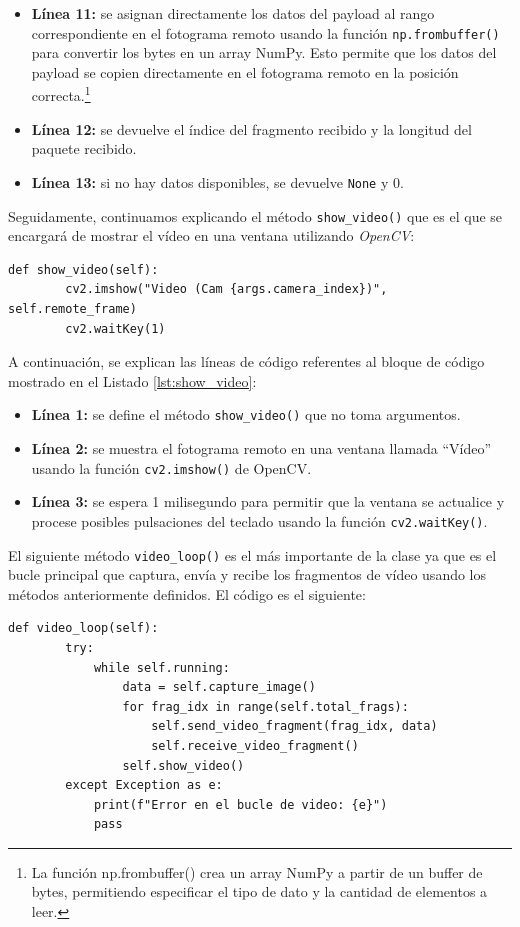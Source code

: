 \begin{itemize}
    \item \textbf{Línea 11:} se asignan directamente los datos del payload al rango correspondiente en el fotograma remoto usando la función \texttt{np.frombuffer()} para convertir los bytes en un array NumPy. Esto permite que los datos del payload se copien directamente en el fotograma remoto en la posición correcta.\footnote{La función np.frombuffer() crea un array NumPy a partir de un buffer de bytes, permitiendo especificar el tipo de dato y la cantidad de elementos a leer.}
    \item \textbf{Línea 12:} se devuelve el índice del fragmento recibido y la longitud del paquete recibido.
    \item \textbf{Línea 13:} si no hay datos disponibles, se devuelve \texttt{None} y 0.
\end{itemize}
\vspace{\baselineskip}

Seguidamente, continuamos explicando el método \texttt{show\_video()} que es el que se encargará de mostrar el vídeo en una ventana utilizando \textit{OpenCV}:
\begin{lstlisting}[style=pythonstyle, caption={Método \texttt{show\_video()} de \textit{Minimal\_Video}.}, label={lst:show_video}]
    def show_video(self):
        cv2.imshow("Video (Cam {args.camera_index})", self.remote_frame)
        cv2.waitKey(1)
\end{lstlisting}

A continuación, se explican las líneas de código referentes al bloque de código mostrado en el Listado \ref{lst:show_video}:
\begin{itemize}
    \item \textbf{Línea 1:} se define el método \texttt{show\_video()} que no toma argumentos.
    \item \textbf{Línea 2:} se muestra el fotograma remoto en una ventana llamada ``Vídeo'' usando la función \texttt{cv2.imshow()} de OpenCV.
    \item \textbf{Línea 3:} se espera 1 milisegundo para permitir que la ventana se actualice y procese posibles pulsaciones del teclado usando la función \texttt{cv2.waitKey()}.
\end{itemize}
\vspace{\baselineskip}

El siguiente método \texttt{video\_loop()} es el más importante de la clase ya que es el bucle principal que captura, envía y recibe los fragmentos de vídeo usando los métodos anteriormente definidos. El código es el siguiente:
\begin{lstlisting}[style=pythonstyle, caption={Método \texttt{video\_loop()} de \textit{Minimal\_Video}.}, label={lst:video_loop_minimal_video}]
def video_loop(self):
        try:
            while self.running:
                data = self.capture_image()
                for frag_idx in range(self.total_frags):
                    self.send_video_fragment(frag_idx, data)
                    self.receive_video_fragment()
                self.show_video()
        except Exception as e:
            print(f"Error en el bucle de video: {e}")
            pass
\end{lstlisting}


